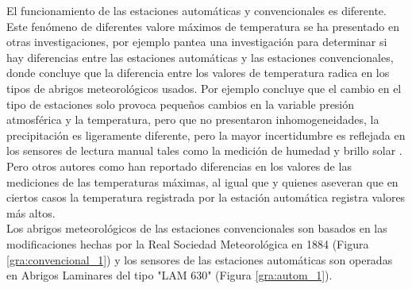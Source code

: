 El funcionamiento de las estaciones automáticas y convencionales es diferente. Este fenómeno de diferentes valore máximos de temperatura se ha presentado en otras investigaciones, por ejemplo \citet{auchmann2012physics} pantea una investigación para determinar si hay diferencias entre las estaciones automáticas y las estaciones convencionales, donde concluye que la diferencia entre los valores de temperatura radica en los tipos de abrigos meteorológicos usados. Por ejemplo \citet{augter2013vergleich} concluye que el cambio en el tipo de estaciones solo provoca pequeños cambios en la variable presión atmosférica y la temperatura, pero que no presentaron inhomogeneidades, la precipitación es ligeramente diferente, pero la mayor incertidumbre es reflejada en los sensores de lectura manual tales como la medición de humedad y brillo solar \citep{augter2013vergleich}. Pero otros autores como \citet{kamtz1831lehrbuch} han reportado diferencias en los valores de las mediciones de las temperaturas máximas, al igual que \citet{lacombe2010results} y \citep{kaspar2016climate} quienes aseveran que en ciertos casos la temperatura registrada por la estación automática registra valores más altos.\\

Los abrigos meteorológicos de las estaciones convencionales son basados en las modificaciones hechas por la Real Sociedad Meteorológica en 1884 (Figura \ref{gra:convencional_1}) y los sensores de las estaciones automáticas son operadas en Abrigos Laminares del tipo "LAM 630" (Figura \ref{gra:autom_1}).

